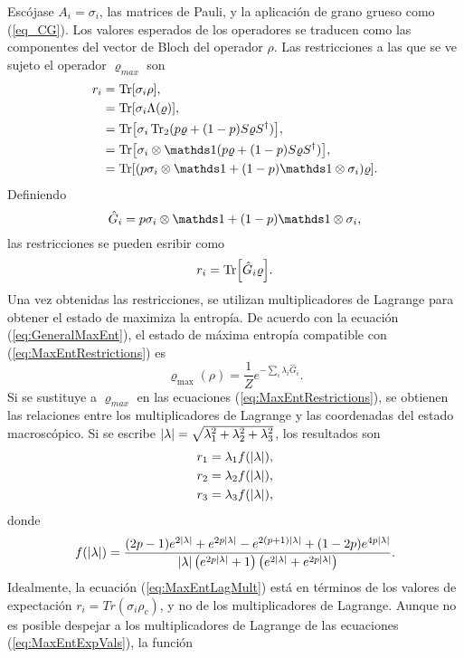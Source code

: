 Escójase ${A_{i}}={\sigma_{i}}$, las matrices de Pauli, y la aplicación de grano grueso como (\ref{eq_CG}). Los valores esperados de los operadores se traducen como las componentes del vector de Bloch del operador $\rho$. Las restricciones a las que se ve sujeto el operador $\varrho_{max}$ son
\begin{align*}
    r_{i}&=\Tr[\sigma_{i}\rho],\\
    &=\Tr[\sigma_{i}\Lambda(\varrho)],\\
    &=\Tr[\sigma_{i}\Tr_{2}(p\varrho+(1-p)S\varrho S^{\dag})],\\
    &=\Tr[\sigma_{i}\otimes\Id(p\varrho+(1-p)S\varrho S^{\dag})],\\
    &=\Tr[(p\sigma_{i}\otimes\Id+(1-p)\Id\otimes\sigma_{i})\varrho].
\end{align*}
Definiendo
\begin{equation}\label{eq:Ghat}
    \hat{G}_{i}=p\sigma_{i}\otimes\Id+(1-p)\Id\otimes\sigma_{i},
\end{equation}
las restricciones se pueden esribir como
\begin{equation}\label{eq:MaxEntRestrictions}
    r_{i}=\Tr[\hat{G}_{i}\varrho].
\end{equation}
Una vez obtenidas las restricciones, se utilizan multiplicadores de Lagrange para obtener el estado de maximiza la entropía. De acuerdo con la ecuación (\ref{eq:GeneralMaxEnt}), el estado de máxima entropía compatible con (\ref{eq:MaxEntRestrictions}) es
\begin{equation}\label{eq:MaxEntLagMult}
    \varrho_{\max}(\rho)=\frac{1}{Z}e^{-\sum_{i}\lambda_{i}\hat{G}_{i}}.
\end{equation}
Si se sustituye a $\varrho_{max}$ en las ecuaciones (\ref{eq:MaxEntRestrictions}), se obtienen las relaciones entre los multiplicadores de Lagrange y las coordenadas del estado macroscópico. Si se escribe $\abs{\lambda}=\sqrt{\lambda_{1}^{2}+\lambda_{2}^{2}+\lambda_{3}^{2}}$, los resultados son
\begin{align}
    \begin{split}\label{eq:MaxEntExpVals}
    r_{1}&=\lambda_{1}f(\abs{\lambda}),\\
    r_{2}&=\lambda_{2}f(\abs{\lambda}),\\
    r_{3}&=\lambda_{3}f(\abs{\lambda}),
    \end{split}
\end{align}
donde
\begin{equation*}
    f(\abs{\lambda})=\frac{(2 p-1) e^{2 \abs{\lambda}}+e^{2 p \abs{\lambda}}-e^{2 (p+1) \abs{\lambda}}+(1-2 p) e^{4 p \abs{\lambda}}}{\abs{\lambda}\left(e^{2 p \abs{\lambda}}+1\right) \left(e^{2 \abs{\lambda}}+e^{2 p \abs{\lambda}}\right)}.
\end{equation*}
Idealmente, la ecuación (\ref{eq:MaxEntLagMult}) está en términos de los valores de expectación $r_{i}=Tr(\sigma_{i}\rho_{c})$, y no de los multiplicadores de Lagrange. Aunque no es posible despejar a los multiplicadores de Lagrange de las ecuaciones (\ref{eq:MaxEntExpVals}), la función 

